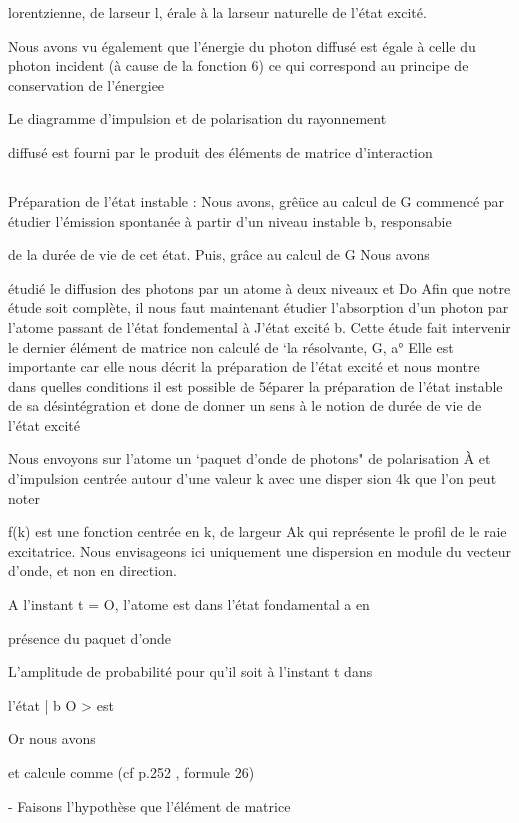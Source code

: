 lorentzienne, de larseur l, érale à la larseur naturelle de l'état excité.

Nous avons vu également que l'énergie du photon diffusé est
égale à celle du photon incident (à cause de la fonction 6) ce qui correspond au principe de conservation de l'énergiee

Le diagramme d'impulsion et de polarisation du rayonnement

diffusé est fourni par le produit des éléments de matrice d'interaction

\subsection{} Préparation de l'état instable :%
Nous avons, grêüce au calcul de G  commencé
par étudier l'émission spontanée à partir d'un niveau instable b, responsabie

de la durée de vie de cet état. Puis, grâce au calcul de G Nous avons

étudié le diffusion des photons par un atome à deux niveaux  et Do Afin que
notre étude soit complète, il nous faut maintenant étudier l'absorption d'un
photon par l'atome passant de l'état fondemental à J'état excité b. Cette
étude fait intervenir le dernier élément de matrice non calculé de ‘la résolvante, G, a° Elle est importante car elle nous décrit la préparation de
l'état excité et nous montre dans quelles conditions il est possible de 5éparer la préparation de l'état instable de sa désintégration et done de donner
un sens à le notion de durée de vie de l'état excité

Nous envoyons sur l'atome un ‘paquet d'onde de photons" de
polarisation À et d'impulsion centrée autour d'une valeur k avec une disper
sion 4k que l'on peut noter

f(k) est une fonction centrée en k, de largeur Ak qui représente le profil de
le raie excitatrice. Nous envisageons ici uniquement une dispersion en module
du vecteur d'onde, et non en direction.

A l'instant t = O, l'atome est dans l'état fondamental a en

présence du paquet d'onde

L'amplitude de probabilité pour qu'il soit à l'instant t dans

l'état | b O > est

Or nous avons

et  calcule comme  (cf p.252 , formule 26)

- Faisons l'hypothèse que l'élément de matrice 


